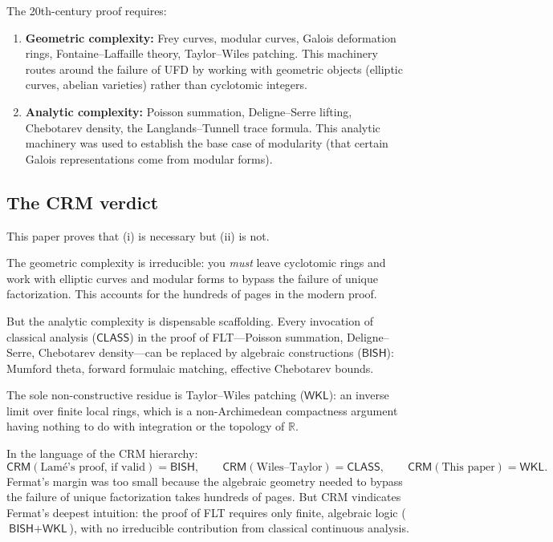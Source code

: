 \documentclass[11pt,a4paper]{article}
\theoremstyle{plain}
\theoremstyle{definition}
\newcommand{\BISH}{\textsf{BISH}}
\newcommand{\WKL}{\textsf{WKL}}
\newcommand{\CLASS}{\textsf{CLASS}}
\newcommand{\CRM}{\textsf{CRM}}
\newcommand{\R}{\mathbb{R}}
\begin{document}
The 20th-century proof requires:
\begin{enumerate}[label=(\roman*),leftmargin=2em]
\item \textbf{Geometric complexity:} Frey curves, modular curves, Galois deformation rings, Fontaine--Laffaille theory, Taylor--Wiles patching.
This machinery routes around the failure of UFD by working with geometric objects (elliptic curves, abelian varieties) rather than cyclotomic integers.
\item \textbf{Analytic complexity:} Poisson summation, Deligne--Serre lifting, Chebotarev density, the Langlands--Tunnell trace formula.
This analytic machinery was used to establish the base case of modularity (that certain Galois representations come from modular forms).
\end{enumerate}

\subsection*{The CRM verdict}

This paper proves that (i) is necessary but (ii) is not.

The geometric complexity is irreducible: you \emph{must} leave cyclotomic rings and work with elliptic curves and modular forms to bypass the failure of unique factorization.
This accounts for the hundreds of pages in the modern proof.

But the analytic complexity is dispensable scaffolding.
Every invocation of classical analysis ($\CLASS$) in the proof of FLT---Poisson summation, Deligne--Serre, Chebotarev density---can be replaced by algebraic constructions ($\BISH$): Mumford theta, forward formulaic matching, effective Chebotarev bounds.

The sole non-constructive residue is Taylor--Wiles patching ($\WKL$): an inverse limit over finite local rings, which is a non-Archimedean compactness argument having nothing to do with integration or the topology of $\R$.

In the language of the CRM hierarchy:
\[
\CRM(\text{Lam\'e's proof, if valid}) = \BISH, \qquad
\CRM(\text{Wiles--Taylor}) = \CLASS, \qquad
\CRM(\text{This paper}) = \WKL.
\]
Fermat's margin was too small because the algebraic geometry needed to bypass the failure of unique factorization takes hundreds of pages.
But CRM vindicates Fermat's deepest intuition: the proof of FLT requires only finite, algebraic logic ($\BISH + \WKL$), with no irreducible contribution from classical continuous analysis.
\end{document}
